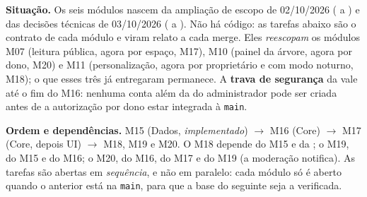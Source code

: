 \textbf{Situação.} Os seis módulos nascem da ampliação de escopo de 02/10/2026 ( a ) e das decisões técnicas de 03/10/2026 ( a ). Não há código: as tarefas abaixo são o contrato de cada módulo e viram relato a cada merge. Eles \emph{reescopam} os módulos M07 (leitura pública, agora por espaço, M17), M10 (painel da árvore, agora por dono, M20) e M11 (personalização, agora por proprietário e com modo noturno, M18); o que esses três já entregaram permanece. A \textbf{trava de segurança} da  vale até o fim do M16: nenhuma conta além da do administrador pode ser criada antes de a autorização por dono estar integrada à \texttt{main}.

\textbf{Ordem e dependências.} M15 (Dados, \emph{implementado}) $\rightarrow$ M16 (Core) $\rightarrow$ M17 (Core, depois UI) $\rightarrow$ M18, M19 e M20. O M18 depende do M15 e da ; o M19, do M15 e do M16; o M20, do M16, do M17 e do M19 (a moderação notifica). As tarefas são abertas em \emph{sequência}, e não em paralelo: cada módulo só é aberto quando o anterior está na \texttt{main}, para que a base do seguinte seja a verificada.


